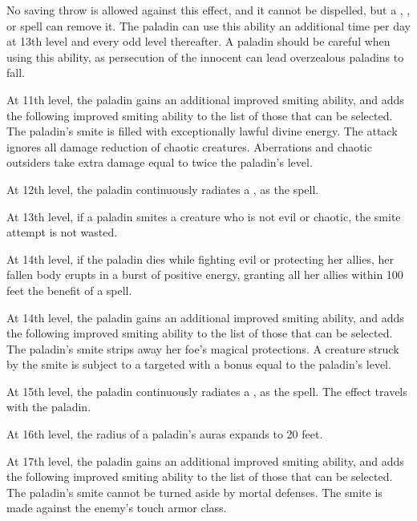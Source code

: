 No saving throw is allowed against this effect, and it cannot be dispelled, but a , , or  spell can remove it. The paladin can use this ability an additional time per day at 13th level and every odd level thereafter. A paladin should be careful when using this ability, as persecution of the innocent can lead overzealous paladins to fall.

 At 11th level, the paladin gains an additional improved smiting ability, and adds the following improved smiting ability to the list of those that can be selected.
 The paladin's smite is filled with exceptionally lawful divine energy. The attack ignores all damage reduction of chaotic creatures. Aberrations and chaotic outsiders take extra damage equal to twice the paladin's level.

 At 12th level, the paladin continuously radiates a , as the spell.

 At 13th level, if a paladin smites a creature who is not evil or chaotic, the smite attempt is not wasted.

 At 14th level, if the paladin dies while fighting evil or protecting her allies, her fallen body erupts in a burst of positive energy, granting all her allies within 100 feet the benefit of a  spell.

 At 14th level, the paladin gains an additional improved smiting ability, and adds the following improved smiting ability to the list of those that can be selected.
 The paladin's smite strips away her foe's magical protections. A creature struck by the smite is subject to a targeted  with a bonus equal to the paladin's level.

 At 15th level, the paladin continuously radiates a , as the spell. The effect travels with the paladin.

 At 16th level, the radius of a paladin's auras expands to 20 feet.

 At 17th level, the paladin gains an additional improved smiting ability, and adds the following improved smiting ability to the list of those that can be selected.
 The paladin's smite cannot be turned aside by mortal defenses. The smite is made against the enemy's touch armor class.

